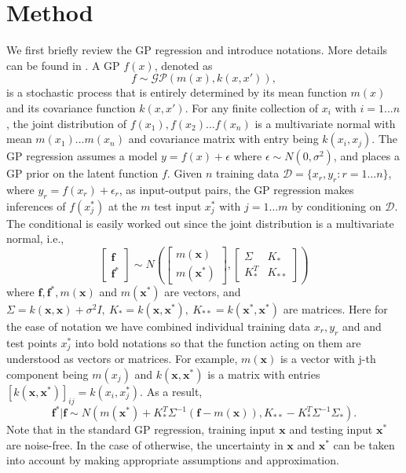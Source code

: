 \documentclass[smallextended,natbib]{svjour3}       %
\begin{document}
\section{Method} \label{sec:GP-method}
We first briefly review the GP regression and introduce notations. More details can be found in \citep{Rasmussen2006}. A GP $f(x)$, denoted as $$f\sim\mathcal{GP}(m(x),k(x,x')),$$ is a stochastic process that is entirely determined by its mean function $m(x)$ and its covariance function $k(x,x')$. For any finite collection of $x_{i}$ with $i=1\ldots n$, the joint distribution of $f(x_{1}),f(x_{2})\ldots f(x_{n})$ is a multivariate normal with mean $m(x_{1})\ldots m(x_{n})$ and covariance matrix with entry being $k(x_{i},x_{j})$. The GP regression assumes a model $y=f(x)+\epsilon$ where $\epsilon\sim N(0,\sigma^{2})$, and places a GP prior on the latent function $f$. Given $n$ training data $\mathcal{D}=\{x_{r},y_{r}:r=1\ldots n\}$, where $y_{r}=f(x_{r})+\epsilon_{r}$, as input-output pairs, the GP regression makes inferences of $f(x_{j}^{*})$ at the $m$ test input $x_{j}^{*}$ with $j=1\ldots m$ by conditioning on $\mathcal{D}$. The conditional is easily worked out since the joint distribution is a multivariate normal, i.e., 
\[
\begin{bmatrix}\mathbf{f}\\
\mathbf{f}^{*}
\end{bmatrix}\sim N(\begin{bmatrix}m(\mathbf{x})\\
m(\mathbf{x}^{*})
\end{bmatrix},\begin{bmatrix}\Sigma & K_{*}\\
K_{*}^{T} & K_{**}
\end{bmatrix})
\]
where $\mathbf{f},\mathbf{f}^{*},m(\mathbf{x})$ and $m(\mathbf{x}^{*})$ are vectors, and $\Sigma=k(\mathbf{x},\mathbf{x})+\sigma^{2}I,\ K_{*}=k(\mathbf{x},\mathbf{x}^{*}),\ K_{**}=k(\mathbf{x}^{*},\mathbf{x}^{*})$ are matrices. Here for the ease of notation we have combined individual training data $x_{r},y_{r}$ and and test points $x_{j}^{*}$ into bold notations so that the function acting on them are understood as vectors or matrices. For example, $m(\mathbf{x})$ is a vector with j-th component being $m(x_{j})$ and $k(\mathbf{x},\mathbf{x}^{*})$ is a matrix with entries $[k(\mathbf{x},\mathbf{x}^{*})]_{ij}=k(x_{i},x_{j}^{*})$. As a result, 
\begin{equation}
\mathbf{f}^{*}\vert\mathbf{f}\sim N(m(\mathbf{x}^{*})+K_{*}^{T}\Sigma^{-1}(\mathbf{f}-m(\mathbf{x})),K_{**}-K_{*}^{T}\Sigma^{-1}\Sigma_{*}). \label{eq:f|f*}
\end{equation}
Note that in the standard GP regression, training input $\mathbf{x}$ and testing input $\mathbf{x}^{*}$ are noise-free. In the case of otherwise, the uncertainty in $\mathbf{x}$ and $\mathbf{x}^{*}$ can be taken into account by making appropriate assumptions and approximation. 
\end{document}
